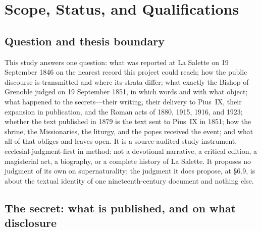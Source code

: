 \sectionguard
\section{Scope, Status, and Qualifications}

\subsection*{Question and thesis boundary}

This study answers one question: what was reported at La Salette on
19 September 1846 on the nearest record this project could reach;
how the public discourse is transmitted and where its strata differ;
what exactly the Bishop of Grenoble judged on 19 September 1851, in
which words and with what object; what happened to the
secrets---their writing, their delivery to Pius~IX, their expansion in
publication, and the Roman acts of 1880, 1915, 1916, and 1923;
whether the text published in 1879 is the text sent to Pius~IX in
1851; how the
shrine, the Missionaries, the liturgy, and the popes received the
event; and what all of that obliges and leaves open. It is a
source-audited study instrument, ecclesial-judgment-first in method:
not a devotional narrative, a critical edition, a magisterial act, a
biography, or a complete history of La Salette. It proposes no
judgment of its own on supernaturality; the judgment it does propose,
at \S6.9, is about the textual identity of one nineteenth-century
document and nothing else.

\subsection*{The secret: what is published, and on what disclosure}


